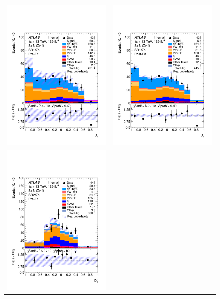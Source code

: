 \clearpage
\begin{figure}[htbp]
	\centering
	\begin{tabular}{cc}
		\includegraphics[width=.45\textwidth]{Chapters/CH8/figures/SPLUSB_CRSR_DL1rc_unblind/Plots/SR1} &
		\includegraphics[width=.45\textwidth]{Chapters/CH8/figures/SPLUSB_CRSR_DL1rc_unblind/Plots/SR1_postFit} \\
		\includegraphics[width=.45\textwidth]{Chapters/CH8/figures/SPLUSB_CRSR_DL1rc_unblind/Plots/SR2} &

\end{tabular}
\end{figure}
